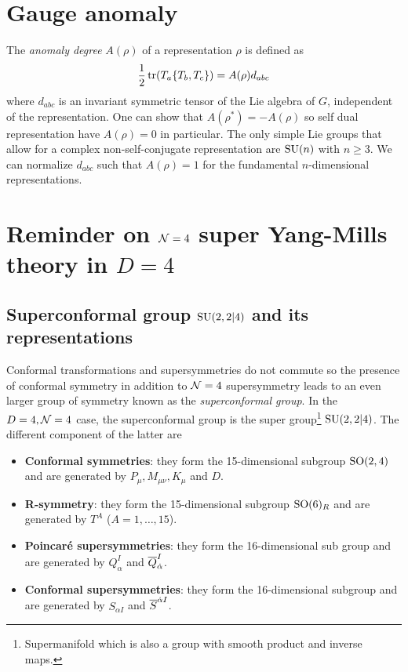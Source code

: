 \documentclass[a4paper,10pt]{article}
\begin{document}
\pagebreak
\appendix

\section{Gauge anomaly}\label{sec:anomalies}

    The \emph{anomaly degree} $A(\rho)$ of a representation $\rho$ is defined as
    \begin{equation}
        \frac{1}{2}\tr(T_a\{T_b,T_c\})=A(\rho)d_{abc}
    \end{equation}
    where $d_{abc}$ is an invariant symmetric tensor of the Lie algebra of $G$, independent of the representation. One can show that $A(\rho^*)=-A(\rho)$ so self dual representation have $A(\rho)=0$ in particular. The only simple Lie groups that allow for a complex non-self-conjugate representation are $\text{SU}(n)$ with $n\geq3$. We can normalize $d_{abc}$ such that $A(\rho)=1$ for the fundamental $n$-dimensional representations.

\section{Reminder on $\mathcal{N}=4$ super Yang-Mills theory in $D=4$}\label{sec:N4SCFT}

    \subsection{Superconformal group $\text{SU}(2,2|4)$ and its representations}

        Conformal transformations and supersymmetries do not commute so the presence of conformal symmetry in addition to $\mathcal{N}=4$ supersymmetry leads to an even larger group of symmetry known as the \emph{superconformal group}. In the $D=4,\mathcal{N}=4$ case, the superconformal group is the super group\footnote{Supermanifold which is also a group with smooth product and inverse maps.} $\text{SU}(2,2|4)$. The different component of the latter are
        \begin{itemize}
            \item \textbf{Conformal symmetries}: they form the 15-dimensional subgroup $\text{SO}(2,4)$ and are generated by $P_\mu,M_{\mu\nu},K_\mu$ and $D$.
            \item \textbf{R-symmetry}: they form the 15-dimensional subgroup $\text{SO}(6)_R$ and are generated by $T^A$ ($A=1,\dots,15$).
            \item \textbf{Poincaré supersymmetries}: they form the 16-dimensional sub group \marker and are generated by $Q^I_\alpha$ and $\overline{Q}^I_{\dot{\alpha}}$.
            \item \textbf{Conformal supersymmetries}: they form the 16-dimensional subgroup \marker and are generated by $S_{\alpha I}$ and $\overline{S}^{\dot{\alpha} I}$.
        \end{itemize}
\end{document}
